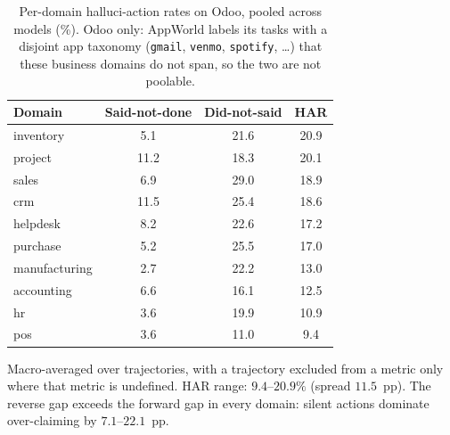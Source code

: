 \begin{table}[H]
\centering
\caption{Per-domain halluci-action rates on Odoo, pooled across models (\%).
Odoo only: AppWorld labels its tasks with a disjoint app taxonomy
(\texttt{gmail}, \texttt{venmo}, \texttt{spotify}, \ldots) that these business
domains do not span, so the two are not poolable.}
\label{tab:har-by-domain}
\begin{tabular}{l c c c}
\toprule
\textbf{Domain} & \textbf{Said-not-done} & \textbf{Did-not-said} & \textbf{HAR} \\
\midrule
inventory        & 5.1 & 21.6 & 20.9 \\
project          & 11.2 & 18.3 & 20.1 \\
sales            & 6.9 & 29.0 & 18.9 \\
crm              & 11.5 & 25.4 & 18.6 \\
helpdesk         & 8.2 & 22.6 & 17.2 \\
purchase         & 5.2 & 25.5 & 17.0 \\
manufacturing    & 2.7 & 22.2 & 13.0 \\
accounting       & 6.6 & 16.1 & 12.5 \\
hr               & 3.6 & 19.9 & 10.9 \\
pos              & 3.6 & 11.0 & 9.4 \\
\bottomrule
\end{tabular}

\vspace{3pt}
\raggedright
\footnotesize Macro-averaged over trajectories, with a trajectory excluded from a
metric only where that metric is undefined. HAR range: $9.4$--$20.9\%$
(spread $11.5$~pp). The reverse gap exceeds the forward gap in every
domain: silent actions dominate over-claiming by $7.1$--$22.1$~pp.
\end{table}
